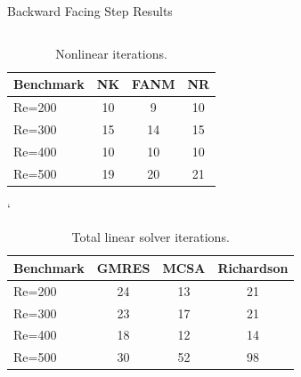 \documentclass{beamer}
\begin{document}
\begin{frame}{Backward Facing Step Results}

  \begin{columns}
    \begin{column}{0.6\textwidth}

      \small{
        \begin{table}[h!]
          \begin{center}
            \begin{tabular}{lccc}\hline\hline
              \multicolumn{1}{l}{Benchmark}& 
              \multicolumn{1}{c}{NK}&
              \multicolumn{1}{c}{FANM}&
              \multicolumn{1}{c}{NR}\\
              \hline
              Re=200 & 10 & 9 & 10\\
              Re=300 & 15 & 14 & 15\\
              Re=400 & 10 & 10 & 10\\
              Re=500 & 19 & 20 & 21\\
              \hline\hline
            \end{tabular}`
          \end{center}
          \caption{Nonlinear iterations.}
        \end{table}

        \begin{table}[h!]
          \begin{center}
            \begin{tabular}{lccc}\hline\hline
              \multicolumn{1}{l}{Benchmark}& 
              \multicolumn{1}{c}{GMRES}&
              \multicolumn{1}{c}{MCSA}&
              \multicolumn{1}{c}{Richardson}\\
              \hline
              Re=200 & 24 & 13 & 21\\
              Re=300 & 23 & 17 & 21\\
              Re=400 & 18 & 12 & 14\\
              Re=500 & 30 & 52 & 98\\
              \hline\hline
            \end{tabular}
          \end{center}
          \caption{Total linear solver iterations.}
        \end{table}
      }

    \end{column}


\end{columns}
\end{frame}
\end{document}

